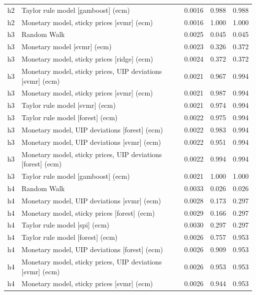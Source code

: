 \begin{ThreePartTable}
\begin{longtable}[t]{cp{5.5cm}ccc}
h2 & \raggedright Taylor rule model [gamboost] (ecm) & 0.0016 & 0.988 & 0.988\\
h2 & \raggedright Monetary model, sticky prices [svmr] (ecm) & 0.0016 & 1.000 & 1.000\\
\addlinespace
h3 & \raggedright Random Walk & 0.0025 & 0.045 & 0.045\\
h3 & \raggedright Monetary model [svmr] (ecm) & 0.0023 & 0.326 & 0.372\\
h3 & \raggedright Monetary model, sticky prices [ridge] (ecm) & 0.0024 & 0.372 & 0.372\\
h3 & \raggedright Monetary model, sticky prices, UIP deviations [svmr] (ecm) & 0.0021 & 0.967 & 0.994\\
h3 & \raggedright Monetary model, sticky prices [svmr] (ecm) & 0.0021 & 0.987 & 0.994\\
h3 & \raggedright Taylor rule model [svmr] (ecm) & 0.0021 & 0.974 & 0.994\\
h3 & \raggedright Taylor rule model [forest] (ecm) & 0.0022 & 0.975 & 0.994\\
h3 & \raggedright Monetary model, UIP deviations [forest] (ecm) & 0.0022 & 0.983 & 0.994\\
h3 & \raggedright Monetary model, UIP deviations [svmr] (ecm) & 0.0022 & 0.951 & 0.994\\
h3 & \raggedright Monetary model, sticky prices, UIP deviations [forest] (ecm) & 0.0022 & 0.994 & 0.994\\
h3 & \raggedright Taylor rule model [gamboost] (ecm) & 0.0021 & 1.000 & 1.000\\
\addlinespace
h4 & \raggedright Random Walk & 0.0033 & 0.026 & 0.026\\
h4 & \raggedright Monetary model, UIP deviations [svmr] (ecm) & 0.0028 & 0.173 & 0.297\\
h4 & \raggedright Monetary model, sticky prices [forest] (ecm) & 0.0029 & 0.166 & 0.297\\
h4 & \raggedright Taylor rule model [spi] (ecm) & 0.0030 & 0.297 & 0.297\\
h4 & \raggedright Taylor rule model [forest] (ecm) & 0.0026 & 0.757 & 0.953\\
h4 & \raggedright Monetary model, UIP deviations [forest] (ecm) & 0.0026 & 0.909 & 0.953\\
h4 & \raggedright Monetary model, sticky prices, UIP deviations [svmr] (ecm) & 0.0026 & 0.953 & 0.953\\
h4 & \raggedright Monetary model, sticky prices [svmr] (ecm) & 0.0026 & 0.944 & 0.953\\

\end{longtable}
\end{ThreePartTable}
